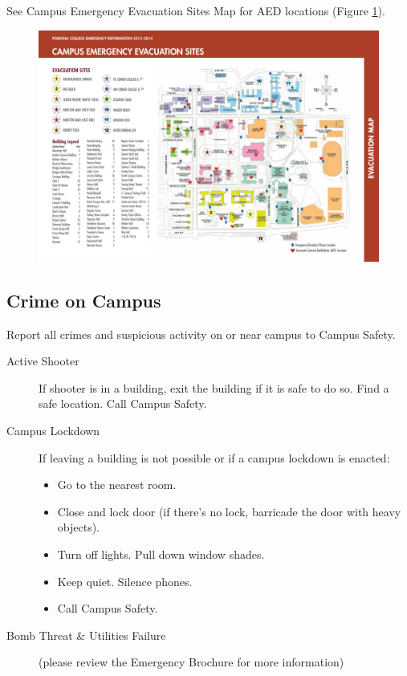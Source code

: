 \documentclass[12pt]{../SOP2}
\begin{document}
\NP See Campus Emergency Evacuation Sites Map for AED locations (Figure \ref{fig:evacmap}).

\begin{figure}
\label{fig:evacmap}
\includegraphics{evacuation-map.pdf}
\end{figure}

\subsection*{Crime on Campus}

\NP Report all crimes and suspicious activity on or near campus to Campus Safety.

\begin{description}
  \item[Active Shooter]If shooter is in a building, exit the building if it is safe to do so. Find a safe location. Call Campus Safety.
  \item[Campus Lockdown] If leaving a building is not possible or if a campus lockdown is enacted:
\begin{itemize}
  \item Go to the nearest room.
  \item Close and lock door (if there’s no lock, barricade the door with heavy objects).
  \item Turn off lights. Pull down window shades.
  \item Keep quiet. Silence phones.
  \item Call Campus Safety.
\end{itemize}
  \item[Bomb Threat \& Utilities Failure](please review the Emergency Brochure for more information)
\end{description}
\end{document}
